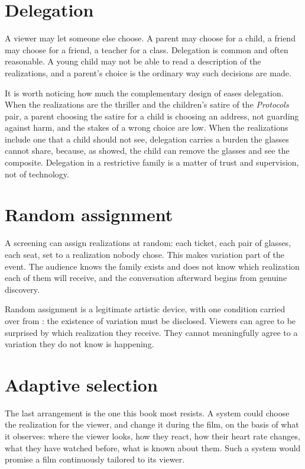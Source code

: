 \section{Delegation}

A viewer may let someone else choose. A parent may choose for a child, a friend may choose for a friend, a teacher for a class. Delegation is common and often reasonable. A young child may not be able to read a description of the realizations, and a parent's choice is the ordinary way such decisions are made.

It is worth noticing how much the complementary design of  eases delegation. When the realizations are the thriller and the children's satire of the \emph{Protocols} pair, a parent choosing the satire for a child is choosing an address, not guarding against harm, and the stakes of a wrong choice are low. When the realizations include one that a child should not see, delegation carries a burden the glasses cannot share, because, as  showed, the child can remove the glasses and see the composite. Delegation in a restrictive family is a matter of trust and supervision, not of technology.

\section{Random assignment}

A screening can assign realizations at random: each ticket, each pair of glasses, each seat, set to a realization nobody chose. This makes variation part of the event. The audience knows the family exists and does not know which realization each of them will receive, and the conversation afterward begins from genuine discovery.

Random assignment is a legitimate artistic device, with one condition carried over from : the existence of variation must be disclosed. Viewers can agree to be surprised by which realization they receive. They cannot meaningfully agree to a variation they do not know is happening.

\section{Adaptive selection}

The last arrangement is the one this book most resists. A system could choose the realization for the viewer, and change it during the film, on the basis of what it observes: where the viewer looks, how they react, how their heart rate changes, what they have watched before, what is known about them. Such a system would promise a film continuously tailored to its viewer.

